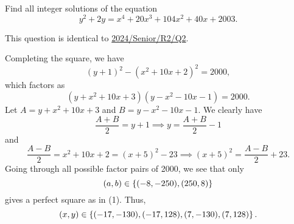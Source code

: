 \begin{question}[${(-17, -130), (-17, 128), (7, -130), (7, 128)}$]\label{Q::2024-J-2-5}
    Find all integer solutions of the equation \[y^2 + 2y = x^4 + 20x^3 + 104x^2 + 40x + 2003.\]
\end{question}
\begin{remark}
    This question is identical to \hyperref[Q::2024-S-2-2]{2024/Senior/R2/Q2}.
\end{remark}
\begin{solution*}
    Completing the square, we have \[(y + 1)^2 - (x^2 + 10x + 2)^2 = 2000,\] which factors as \[(y + x^2 + 10x + 3)(y - x^2 - 10x - 1) = 2000.\] Let $A = y + x^2 + 10x + 3$ and $B = y - x^2 - 10x - 1$. We clearly have \[\frac{A + B}{2} = y + 1 \implies y = \frac{A + B}{2} - 1\] and \[\frac{A - B}{2} = x^2 + 10x + 2 = (x+5)^2 - 23 \implies (x+5)^2 = \frac{A-B}{2} + 23 \tag{1}.\] Going through all possible factor pairs of 2000, we see that only \[(a, b) \in \left\lbrace (-8, -250), (250, 8) \right\rbrace\] gives a perfect square as in (1). Thus, \[(x, y) \in \left\lbrace (-17, -130), (-17, 128), (7, -130), (7, 128) \right\rbrace.\]
\end{solution*}